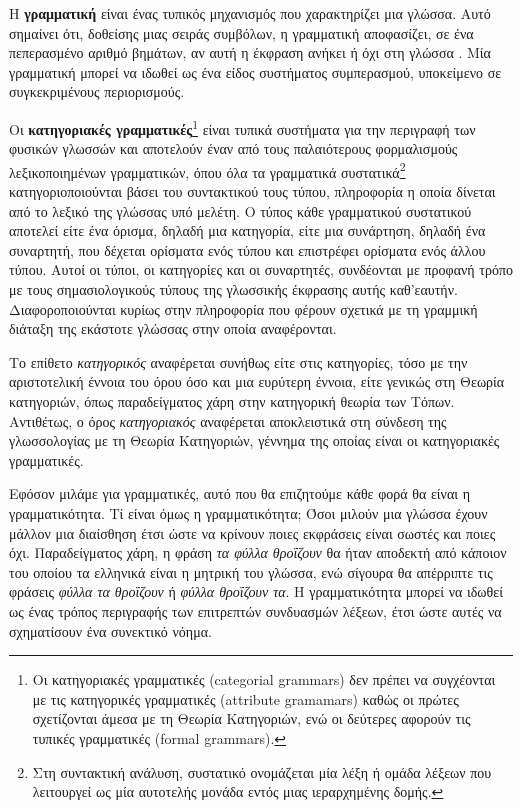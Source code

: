 \documentclass [a4paper,11pt] {book}
\theoremstyle{definition}
\theoremstyle{definition}
\newenvironment{remark}[1][Παρατήρηση]{\begin{trivlist}
\item[\hskip \labelsep {\bfseries #1}]}{\end{trivlist}}
\begin{document}
Η \textbf{γραμματική} είναι ένας τυπικός μηχανισμός που χαρακτηρίζει μια γλώσσα. Αυτό σημαίνει ότι, δοθείσης μιας σειράς συμβόλων, η γραμματική αποφασίζει, σε ένα πεπερασμένο αριθμό βημάτων, αν αυτή η έκφραση ανήκει ή όχι στη γλώσσα \citep{Chomsky1991}. Μία γραμματική μπορεί να ιδωθεί ως ένα είδος συστήματος συμπερασμού, υποκείμενο σε συγκεκριμένους περιορισμούς.

Οι \textbf{κατηγοριακές γραμματικές}\footnote{Οι κατηγοριακές γραμματικές (categorial grammars) δεν πρέπει να συγχέονται με τις κατηγορικές γραμματικές (attribute gramamars) καθώς οι πρώτες σχετίζονται άμεσα με τη Θεωρία Κατηγοριών, ενώ οι δεύτερες αφορούν τις τυπικές γραμματικές (formal grammars).} είναι τυπικά συστήματα για την περιγραφή των φυσικών γλωσσών και αποτελούν έναν από τους παλαιότερους φορμαλισμούς λεξικοποιημένων γραμματικών, όπου όλα τα γραμματικά συστατικά\footnote{Στη συντακτική ανάλυση, συστατικό ονομάζεται μία λέξη ή ομάδα λέξεων που λειτουργεί ως μία αυτοτελής μονάδα εντός μιας ιεραρχημένης δομής.} κατηγοριοποιούνται βάσει του συντακτικού τους τύπου, πληροφορία η οποία δίνεται από το λεξικό της γλώσσας υπό μελέτη. Ο τύπος κάθε γραμματικού συστατικού αποτελεί είτε ένα όρισμα, δηλαδή μια κατηγορία, είτε μια συνάρτηση, δηλαδή ένα συναρτητή, που δέχεται ορίσματα ενός τύπου και επιστρέφει ορίσματα ενός άλλου τύπου. Αυτοί οι τύποι, οι κατηγορίες και οι συναρτητές, συνδέονται με προφανή τρόπο με τους σημασιολογικούς τύπους της γλωσσικής έκφρασης αυτής καθ'εαυτήν. Διαφοροποιούνται κυρίως στην πληροφορία που φέρουν σχετικά με τη γραμμική διάταξη της εκάστοτε γλώσσας στην οποία αναφέρονται.
\begin{remark}
\label{categorial-categorical}
Το επίθετο \textit{κατηγορικός} αναφέρεται συνήθως είτε στις κατηγορίες, τόσο με την αριστοτελική έννοια του όρου όσο και μια ευρύτερη έννοια, είτε γενικώς στη Θεωρία κατηγοριών, όπως παραδείγματος χάρη στην κατηγορική θεωρία των Τόπων. Αντιθέτως, ο όρος \textit{κατηγοριακός} αναφέρεται αποκλειστικά στη σύνδεση της γλωσσολογίας με τη Θεωρία Κατηγοριών, γέννημα της οποίας είναι οι κατηγοριακές γραμματικές.
\end{remark}
Εφόσον μιλάμε για γραμματικές, αυτό που θα επιζητούμε κάθε φορά θα είναι η γραμματικότητα. Τί είναι όμως η γραμματικότητα; Όσοι μιλούν μια γλώσσα έχουν μάλλον μια διαίσθηση έτσι ώστε να κρίνουν ποιες εκφράσεις είναι σωστές και ποιες όχι. Παραδείγματος χάρη, η φράση \textit{τα φύλλα θροΐζουν} θα ήταν αποδεκτή από κάποιον του οποίου τα ελληνικά είναι η μητρική του γλώσσα, ενώ σίγουρα θα απέρριπτε τις φράσεις \textit{φύλλα τα θροΐζουν} ή \textit{φύλλα θροΐζουν τα}. Η γραμματικότητα μπορεί να ιδωθεί ως ένας τρόπος περιγραφής των επιτρεπτών συνδυασμών λέξεων, έτσι ώστε αυτές να σχηματίσουν ένα συνεκτικό νόημα.
\end{document}
